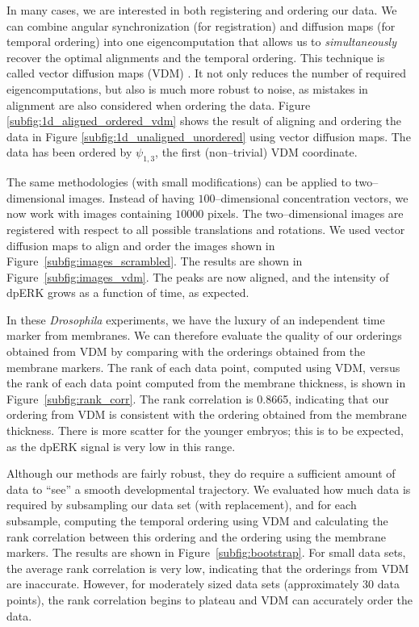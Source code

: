 \documentclass{pnastwo}
\begin{document}
\begin{article}
In many cases, we are interested in both registering and ordering our data.
%
%
We can combine angular synchronization (for registration) and diffusion maps (for temporal ordering) into one eigencomputation that allows us to {\em simultaneously} recover the optimal alignments and the temporal ordering.
%
This technique is called vector diffusion maps (VDM) \cite{singer2012vector}.
%
It not only reduces the number of required eigencomputations, but also is much more robust to noise, as mistakes in alignment are also considered when ordering the data.
%
Figure \ref{subfig:1d_aligned_ordered_vdm} shows the result of aligning and ordering the data in Figure \ref{subfig:1d_unaligned_unordered} using vector diffusion maps. 
%
The data has been ordered by $\psi_{1, 3}$, the first (non--trivial) VDM coordinate. 

The same methodologies (with small modifications) can be applied to two--dimensional images.
%
Instead of having $100$--dimensional concentration vectors, we now work with images containing $10000$ pixels.
%
The two--dimensional images are registered with respect to all possible translations and rotations. 
%
We used vector diffusion maps to align and order the images shown in Figure~\ref{subfig:images_scrambled}.
%
The results are shown in Figure~\ref{subfig:images_vdm}.
%
The peaks are now aligned, and the intensity of dpERK grows as a function of time, as expected.

In these {\em Drosophila} experiments, we have the luxury of an independent time marker from membranes.
%
We can therefore evaluate the quality of our orderings obtained from VDM by comparing with the orderings obtained from the membrane markers.
%
The rank of each data point, computed using VDM, versus the rank of each data point computed from the membrane thickness, is shown in Figure~\ref{subfig:rank_corr}.
%
The rank correlation is 0.8665, indicating that our ordering from VDM is consistent with the ordering obtained from the membrane thickness.
%
There is more scatter for the younger embryos; this is to be expected, as the dpERK signal is very low in this range.

Although our methods are fairly robust, they do require a sufficient amount of data to ``see'' a smooth developmental trajectory.
%
We evaluated how much data is required by subsampling our data set (with replacement), and for each subsample, computing the temporal ordering using VDM and calculating the rank correlation between this ordering and the ordering using the membrane markers.
%
The results are shown in Figure~\ref{subfig:bootstrap}.
%
For small data sets, the average rank correlation is very low, indicating that the orderings from VDM are inaccurate. 
%
However, for moderately sized data sets (approximately 30 data points), the 
rank correlation begins to plateau and VDM can accurately order the data.


\end{article}
\end{document}

